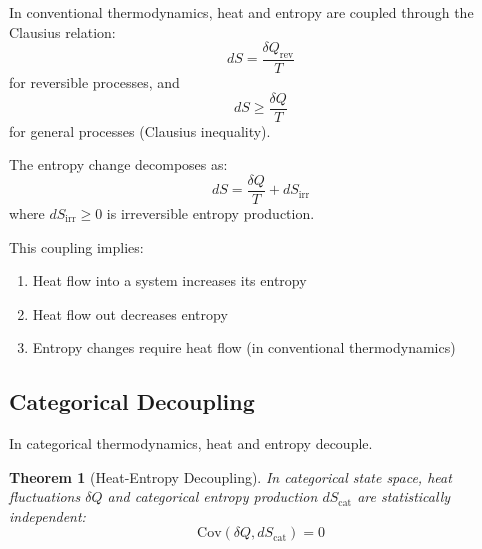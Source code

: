 \documentclass[twocolumn,10pt,twoside]{article}
\newtheorem{theorem}{Theorem}[section]
\newcommand{\Scat}{S_{\mathrm{cat}}}
\begin{document}
In conventional thermodynamics, heat and entropy are coupled through the Clausius relation:
\begin{equation}
dS = \frac{\delta Q_{\text{rev}}}{T}
\label{eq:clausius}
\end{equation}
for reversible processes, and
\begin{equation}
dS \geq \frac{\delta Q}{T}
\label{eq:clausius_inequality}
\end{equation}
for general processes (Clausius inequality).

The entropy change decomposes as:
\begin{equation}
dS = \frac{\delta Q}{T} + dS_{\text{irr}}
\label{eq:entropy_decomposition}
\end{equation}
where $dS_{\text{irr}} \geq 0$ is irreversible entropy production.

This coupling implies:
\begin{enumerate}
    \item Heat flow into a system increases its entropy
    \item Heat flow out decreases entropy
    \item Entropy changes require heat flow (in conventional thermodynamics)
\end{enumerate}

\subsection{Categorical Decoupling}

In categorical thermodynamics, heat and entropy decouple.

\begin{theorem}[Heat-Entropy Decoupling]
\label{thm:decoupling}
In categorical state space, heat fluctuations $\delta Q$ and categorical entropy production $d\Scat$ are statistically independent:
\begin{equation}
\text{Cov}(\delta Q, d\Scat) = 0
\label{eq:covariance_zero}
\end{equation}
\end{theorem}
\end{document}
